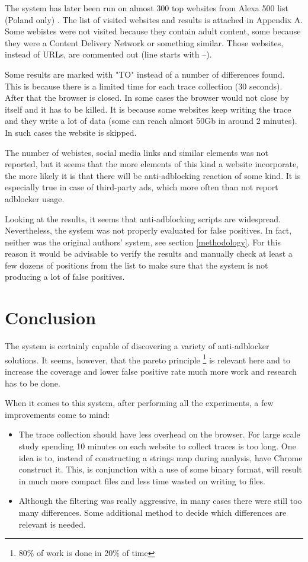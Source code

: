 
The system has later been run on almost 300 top websites from Alexa 500 list (Poland only) \cite{alexa-list}.
The list of visited websites and results is attached in Appendix A. Some webistes were not visited because they
contain adult content, some because they were a Content Delivery Network or something similar. Those
websites, instead of URLs, are commented out (line starts with --).

Some results are marked with "TO" instead of a number of differences found. This is because
there is a limited time for each trace collection (30 seconds). After that the browser is closed.
In some cases the browser would not close by itself and it has to be killed. It is because 
some websites keep writing the trace and they write a lot of data (some can reach almost 50Gb in around 2 minutes).
In such cases the website is skipped.

The number of webistes, social media links and similar elements was not reported, but it seems that the more 
elements of this kind a website incorporate, the more likely it is that there will be anti-adblocking reaction of some kind.
It is especially true in case of third-party ads, which more often than not report adblocker usage.

Looking at the results, it seems that anti-adblocking scripts are widespread. 
Nevertheless, the system was not properly evaluated for false positives.
In fact, neither was the original authors' system, see section \ref{methodology}.
For this reason it would be advisable to verify the results and manually check at least 
a few dozens of positions from the list to make sure that the system is not producing 
a lot of false positives.


\section{Conclusion}

The system is certainly capable of discovering a variety of anti-adblocker solutions.
It seems, however, that the pareto principle \footnote{80\% of work is done in 20\% of time}
is relevant here and to increase the coverage and lower false positive rate
much more work and research has to be done.

When it comes to this system, after performing all the experiments, a few improvements come to mind:
\begin{itemize}
  \item The trace collection should have less overhead on the browser. For large scale study
           spending 10 minutes on each website to collect traces is too long.
           One idea is to, instead of constructing a strings map during analysis, have
           Chrome construct it. This, is conjunction with a use of some binary format, will
           result in much more compact files and less time wasted on writing to files.
  \item Although the filtering was really aggressive, in many cases there were still too many differences.
           Some additional method to decide which differences are relevant is needed.
\end{itemize}


